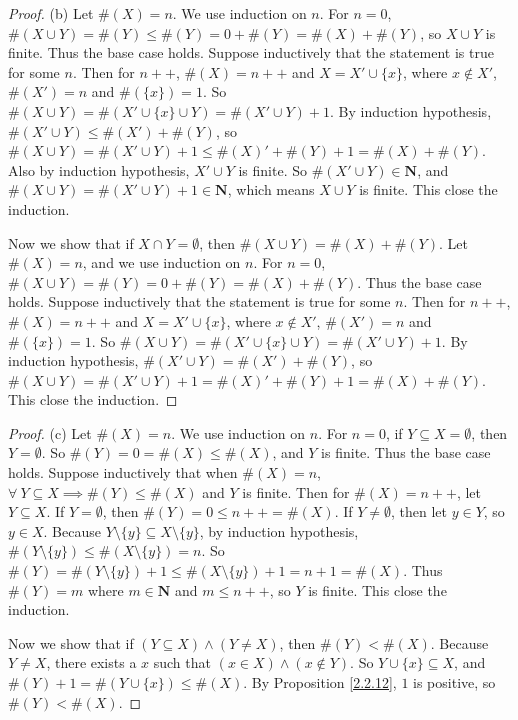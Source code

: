 \begin{proof}{(b)}
Let \(\#(X) = n\).
We use induction on \(n\).
For \(n = 0\), \(\#(X \cup Y) = \#(Y) \leq \#(Y) = 0 + \#(Y) = \#(X) + \#(Y)\), so \(X \cup Y\) is finite.
Thus the base case holds.
Suppose inductively that the statement is true for some \(n\).
Then for \(n++\), \(\#(X) = n++\) and \(X = X' \cup \{x\}\), where \(x \notin X'\), \(\#(X') = n\) and \(\#(\{x\}) = 1\).
So \(\#(X \cup Y) = \#(X' \cup \{x\} \cup Y) = \#(X' \cup Y) + 1\).
By induction hypothesis, \(\#(X' \cup  Y) \leq \#(X') + \#(Y)\), so \(\#(X \cup  Y) = \#(X' \cup  Y) + 1 \leq \#(X)' + \#(Y) + 1 = \#(X) + \#(Y)\).
Also by induction hypothesis, \(X' \cup Y\) is finite.
So \(\#(X' \cup Y) \in \mathbf{N}\), and \(\#(X \cup Y) = \#(X' \cup Y) + 1 \in \mathbf{N}\), which means \(X \cup Y\) is finite.
This close the induction.

Now we show that if \(X \cap Y = \emptyset\), then \(\#(X \cup Y) = \#(X) + \#(Y)\).
Let \(\#(X) = n\), and we use induction on \(n\).
For \(n = 0\), \(\#(X \cup Y) = \#(Y) = 0 + \#(Y) = \#(X) + \#(Y)\).
Thus the base case holds.
Suppose inductively that the statement is true for some \(n\).
Then for \(n++\), \(\#(X) = n++\) and \(X = X' \cup \{x\}\), where \(x \notin X'\), \(\#(X') = n\) and \(\#(\{x\}) = 1\).
So \(\#(X \cup Y) = \#(X' \cup \{x\} \cup Y) = \#(X' \cup Y) + 1\).
By induction hypothesis, \(\#(X' \cup  Y) = \#(X') + \#(Y)\), so \(\#(X \cup  Y) = \#(X' \cup  Y) + 1 = \#(X)' + \#(Y) + 1 = \#(X) + \#(Y)\).
This close the induction.
\end{proof}

\begin{proof}{(c)}
Let \(\#(X) = n\).
We use induction on \(n\).
For \(n = 0\), if \(Y \subseteq X = \emptyset\), then \(Y = \emptyset\).
So \(\#(Y) = 0 = \#(X) \leq \#(X)\), and \(Y\) is finite.
Thus the base case holds.
Suppose inductively that when \(\#(X) = n\), \(\forall\ Y \subseteq X \implies \#(Y) \leq \#(X)\) and \(Y\) is finite.
Then for \(\#(X) = n++\), let \(Y \subseteq X\).
If \(Y = \emptyset\), then \(\#(Y) = 0 \leq n++ = \#(X)\).
If \(Y \neq \emptyset\), then let \(y \in Y\), so \(y \in X\).
Because \(Y \setminus \{y\}  \subseteq X \setminus \{y\}\), by induction hypothesis, \(\#(Y \setminus \{y\}) \leq \#(X \setminus \{y\}) = n\).
So \(\#(Y) = \#(Y \setminus \{y\}) + 1 \leq \#(X \setminus \{y\}) + 1 = n + 1 = \#(X)\).
Thus \(\#(Y) = m\) where \(m \in \mathbf{N}\) and \(m \leq n++\), so \(Y\) is finite.
This close the induction.

Now we show that if \((Y \subseteq X) \land (Y \neq X)\), then \(\#(Y) < \#(X)\).
Because \(Y \neq X\), there exists a \(x\) such that \((x \in X) \land (x \notin Y)\).
So \(Y \cup \{x\} \subseteq X\), and \(\#(Y) + 1 = \#(Y \cup \{x\}) \leq \#(X)\).
By Proposition \ref{2.2.12}, \(1\) is positive, so \(\#(Y) < \#(X)\).
\end{proof}

